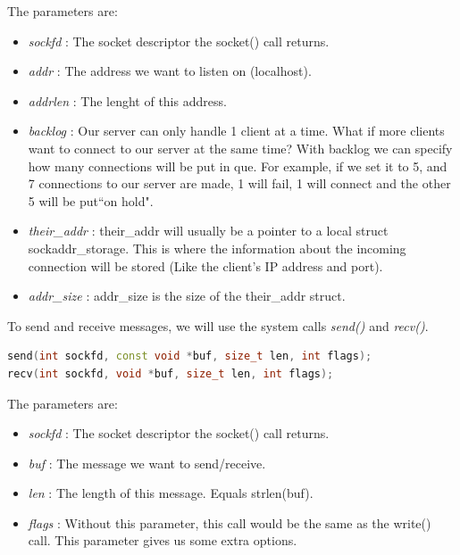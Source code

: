 \documentclass{article}
\begin{document}
				The parameters are:

				\begin{itemize}
				\item \textit{sockfd} : The socket descriptor the socket() call returns. 
				\item \textit{addr} : The address we want to listen on (localhost). 
				\item \textit{addrlen} : The lenght of this address.
				\item \textit{backlog} : Our server can only handle 1 client at a time. What if more clients want to connect to our server at the same time? With backlog we can specify how many connections will be put in que. For example, if we set it to 5, and 7 connections to our server are made, 1 will fail, 1 will connect and the other 5 will be put``on hold".  
				\item \textit{their\_addr} : their\_addr will usually be a pointer to a local struct sockaddr\_storage. This is where the information about the incoming connection will be stored (Like the client's IP address and port). 
				\item \textit{addr\_size} : addr\_size is the size of the their\_addr struct. 
				\end{itemize}

				To send and receive messages, we will use the system calls \textit{send()} and \textit{recv()}.

				\begin{lstlisting}[language=C++, caption={send() and recv() function}]
send(int sockfd, const void *buf, size_t len, int flags); 
recv(int sockfd, void *buf, size_t len, int flags); 
				\end{lstlisting}

				The parameters are:

				\begin{itemize}
				\item \textit{sockfd} : The socket descriptor the socket() call returns. 
				\item \textit{buf} : The message we want to send/receive. 
				\item \textit{len} : The length of this message. Equals strlen(buf). 
				\item \textit{flags} : Without this parameter, this call would be the same as the write() call. This parameter gives us some extra options. 
				\end{itemize}
\end{document}
